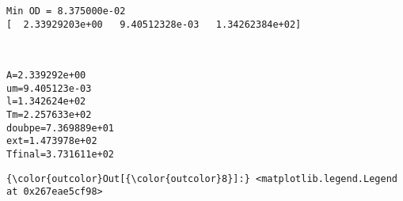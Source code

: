 \documentclass[11pt]{article}
\begin{document}
    \begin{Verbatim}[commandchars=\\\{\}]
Min OD = 8.375000e-02
[  2.33929203e+00   9.40512328e-03   1.34262384e+02]

    \end{Verbatim}

    \begin{center}
    \end{center}
    { \hspace*{\fill} \\}
    
    \begin{Verbatim}[commandchars=\\\{\}]
A=2.339292e+00
um=9.405123e-03
l=1.342624e+02
Tm=2.257633e+02
doubpe=7.369889e+01
ext=1.473978e+02
Tfinal=3.731611e+02

    \end{Verbatim}

            \begin{Verbatim}[commandchars=\\\{\}]
{\color{outcolor}Out[{\color{outcolor}8}]:} <matplotlib.legend.Legend at 0x267eae5cf98>
\end{Verbatim}
        
    \begin{center}
    \end{center}
    { \hspace*{\fill} \\}
    
    \begin{center}
    \end{center}
    { \hspace*{\fill} \\}
    
\end{document}
